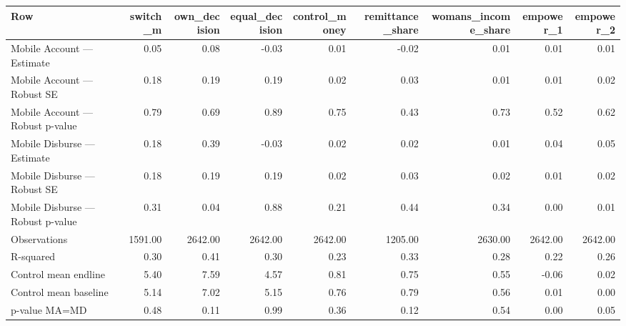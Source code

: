
\begin{tabular}{lrrrrrrrr}
\toprule
Row & switch\_m & own\_decision & equal\_decision & control\_money & remittance\_share & womans\_income\_share & empower\_1 & empower\_2\\
\midrule
Mobile Account — Estimate & 0.05 & 0.08 & -0.03 & 0.01 & -0.02 & 0.01 & 0.01 & 0.01\\
Mobile Account — Robust SE & 0.18 & 0.19 & 0.19 & 0.02 & 0.03 & 0.01 & 0.01 & 0.02\\
Mobile Account — Robust p-value & 0.79 & 0.69 & 0.89 & 0.75 & 0.43 & 0.73 & 0.52 & 0.62\\
Mobile Disburse — Estimate & 0.18 & 0.39 & -0.03 & 0.02 & 0.02 & 0.01 & 0.04 & 0.05\\
Mobile Disburse — Robust SE & 0.18 & 0.19 & 0.19 & 0.02 & 0.03 & 0.02 & 0.01 & 0.02\\
\addlinespace
Mobile Disburse — Robust p-value & 0.31 & 0.04 & 0.88 & 0.21 & 0.44 & 0.34 & 0.00 & 0.01\\
Observations & 1591.00 & 2642.00 & 2642.00 & 2642.00 & 1205.00 & 2630.00 & 2642.00 & 2642.00\\
R-squared & 0.30 & 0.41 & 0.30 & 0.23 & 0.33 & 0.28 & 0.22 & 0.26\\
Control mean endline & 5.40 & 7.59 & 4.57 & 0.81 & 0.75 & 0.55 & -0.06 & 0.02\\
Control mean baseline & 5.14 & 7.02 & 5.15 & 0.76 & 0.79 & 0.56 & 0.01 & 0.00\\
\addlinespace
p-value MA=MD & 0.48 & 0.11 & 0.99 & 0.36 & 0.12 & 0.54 & 0.00 & 0.05\\
\bottomrule
\end{tabular}
